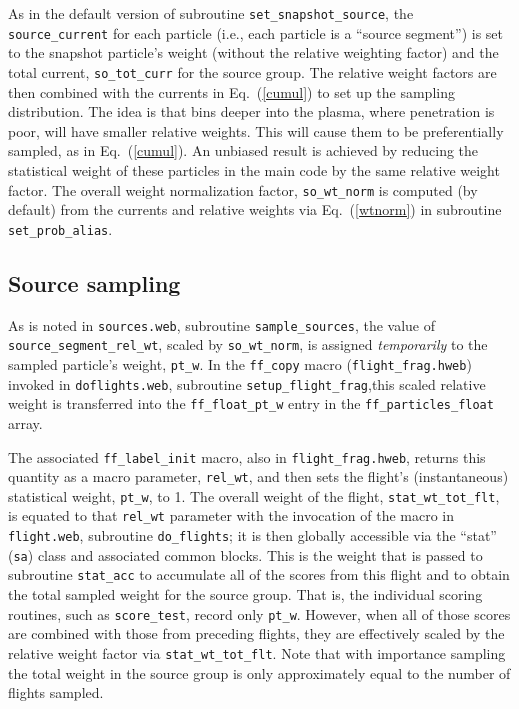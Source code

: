 \documentclass[12pt]{report}
\begin{document}
As in the default version of subroutine {\tt set\_snapshot\_source}, the
{\tt source\_current} for each particle (i.e., each particle is a
``source segment'') is set to the snapshot particle's weight 
(without the relative weighting factor) and the total current,
{\tt so\_tot\_curr} for the source group.
The relative weight factors are then combined with the currents
in Eq.~(\ref{cumul}) to set up the sampling distribution.
The idea is that bins deeper into the plasma, where
penetration is poor, will have smaller relative weights.  This
will cause them to be preferentially sampled, as in Eq.~(\ref{cumul}).
An unbiased result is achieved by reducing the statistical
weight of these particles in the main code by the same 
relative weight factor.
The overall weight normalization factor,
{\tt so\_wt\_norm} is computed (by default) from the currents and relative 
weights via Eq.~(\ref{wtnorm}) in subroutine {\tt set\_prob\_alias}.

\subsection{Source sampling}

As is noted in {\tt sources.web}, subroutine {\tt sample\_sources},
the value of {\tt source\_segment\_rel\_wt}, scaled by
{\tt so\_wt\_norm}, is assigned {\em temporarily} to the sampled particle's
weight, {\tt pt\_w}.  In the {\tt ff\_copy} macro ({\tt flight\_frag.hweb}) 
invoked in
{\tt doflights.web}, subroutine {\tt setup\_flight\_frag},this scaled relative
weight is transferred into the {\tt ff\_float\_pt\_w} entry in the
{\tt ff\_particles\_float} array.

The associated {\tt ff\_label\_init} macro, also in {\tt flight\_frag.hweb},
returns this quantity as a macro parameter, {\tt rel\_wt}, and then sets
the flight's (instantaneous) statistical weight, {\tt pt\_w}, to 1.  
The overall weight of the flight, {\tt stat\_wt\_tot\_flt}, is equated
to that {\tt rel\_wt} parameter with the invocation of the
macro in {\tt flight.web},
subroutine {\tt do\_flights}; it is then globally accessible via the 
``stat'' ({\tt sa}) class and associated common blocks.  This is
the weight that is passed to subroutine {\tt stat\_acc} to accumulate
all of the scores from this flight and to obtain the total sampled
weight for the source group.  That is, the individual scoring routines,
such as {\tt score\_test}, record only {\tt pt\_w}.  However, when all of
those scores are combined with those from preceding flights, they are
effectively scaled by the relative weight factor via {\tt stat\_wt\_tot\_flt}.
Note that with importance sampling the
total weight in the source group is only 
approximately equal to the number of flights
sampled.
\end{document}
